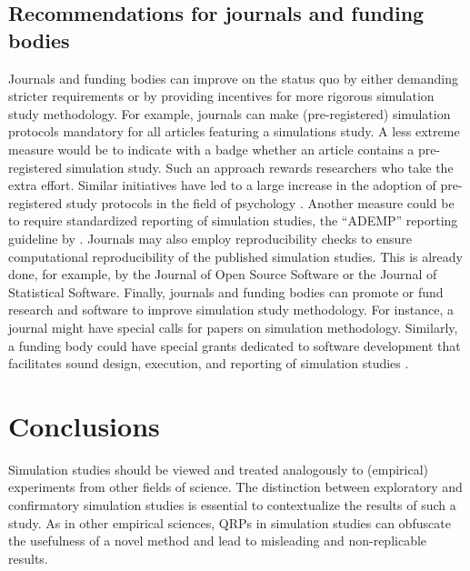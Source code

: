 \documentclass[a4paper, 11pt]{article}
\begin{document}
\subsection{Recommendations for journals and funding bodies}
Journals and funding bodies can improve on the status quo by either demanding stricter
requirements or by providing incentives for more rigorous simulation study
methodology. For example, journals can make (pre-registered) simulation protocols mandatory for
all articles featuring a simulations study. A less extreme measure would be to
indicate with a badge whether an article contains a pre-registered simulation
study. Such an approach rewards researchers who take the extra effort. Similar
initiatives have led to a large increase in the adoption of pre-registered study
protocols in the field of psychology \citep{Kidwell2016}. Another measure could be
to require standardized reporting of simulation studies, \eg the ``ADEMP''
reporting guideline by \citet{Morris2019}. Journals may also employ
reproducibility checks to ensure computational reproducibility of the
published simulation studies. This is already done, for example, by 
the Journal of Open Source Software or the Journal of Statistical
Software. Finally, journals and funding bodies can promote or fund
research and software to improve simulation study methodology. For instance, a
journal might have special calls for papers on simulation methodology.
Similarly, a funding body could have special grants dedicated to software development
that facilitates sound design, execution, and reporting of simulation studies
\citep[as, for example,][]{White2010, Gasparini2018, Chalmers2020}.

\section{Conclusions} \label{sec:discussion}

Simulation studies should be viewed and treated analogously to (empirical)
experiments from other fields of science. The distinction between exploratory and
confirmatory simulation studies is essential to contextualize the results of
such a study. As in other empirical sciences, QRPs in simulation studies can 
obfuscate the usefulness of a novel method and lead to misleading and non-replicable results.
\end{document}
